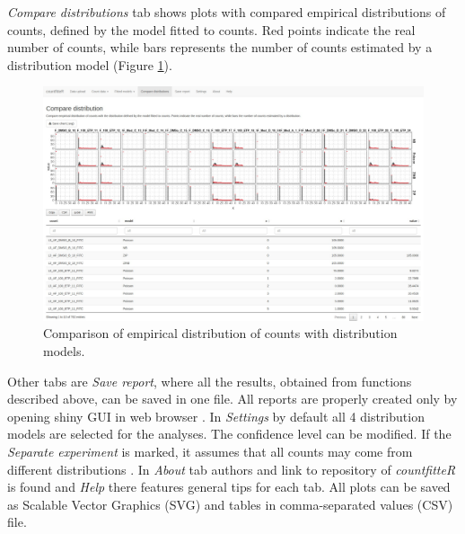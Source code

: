 \textit{Compare distributions} tab shows plots with compared empirical distributions of counts, defined by the model fitted to counts. Red points indicate the real number of counts, while bars represents the number of counts estimated by a distribution model (Figure \ref{cf_cmp}).

\begin{figure}[htbp]
  \centering
  \includegraphics[width=0.99\columnwidth]{fig/cf_cmp.pdf}
  \caption{Comparison of empirical distribution of counts with distribution models.}
    \label{cf_cmp}
\end{figure}

Other tabs are \textit{Save report}, where all the results, obtained from functions described above, can be saved in one file. All reports are properly created only by opening shiny GUI in web browser
. In \textit{Settings} by default all 4 distribution models are selected for the analyses. The confidence level can be modified. If the \textit{Separate experiment} is marked, it assumes that all counts may come from different distributions
. In \textit{About} tab authors and link to repository of \emph{countfitteR} is found and \textit{Help} there features general tips for each tab. All plots can be saved as Scalable Vector Graphics (SVG) and tables in comma-separated values (CSV) file.



